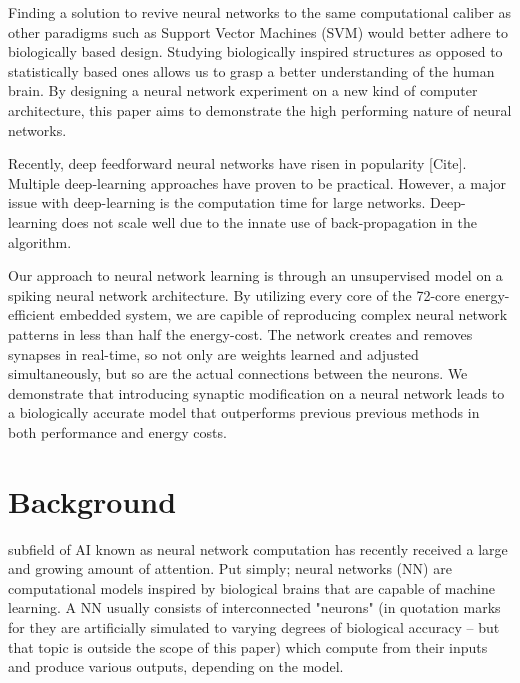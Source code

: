 \documentclass[journal]{./sty/IEEEtran}
\begin{document}
Finding a solution to revive neural networks to the same computational caliber 
as other paradigms such as Support Vector Machines (SVM) would better adhere to biologically based design.
Studying biologically inspired structures as opposed to statistically based ones allows us to grasp a better understanding of the human brain.
By designing a neural network experiment on a new kind of computer architecture, 
this paper aims to demonstrate the high performing nature of neural networks.

Recently, deep feedforward neural networks have risen in popularity [Cite]. 
Multiple deep-learning approaches have proven to be practical.
However, a major issue with deep-learning is the computation time for large networks.
Deep-learning does not scale well due to the innate use of back-propagation in the algorithm.

Our approach to neural network learning is through an unsupervised model on a spiking neural network architecture.
By utilizing every core of the 72-core energy-efficient embedded system, 
we are capible of reproducing complex neural network patterns in less than half the energy-cost. 
The network creates and removes synapses in real-time, so not only are weights learned and adjusted simultaneously, 
but so are the actual connections between the neurons.
We demonstrate that introducing synaptic modification on a neural network leads to a biologically accurate model
that outperforms previous previous methods in both performance and energy costs.


\section{Background}
 subfield of AI known as neural network computation has recently received a large and growing amount of attention. 
Put simply; neural networks (NN) are computational models inspired by biological brains that are capable of machine learning. 
A NN usually consists of interconnected "neurons" (in quotation marks for they are artificially simulated to varying degrees of biological accuracy -- but that topic is outside the scope of this paper) which compute from their inputs and produce various outputs, depending on the model. 
\end{document}
